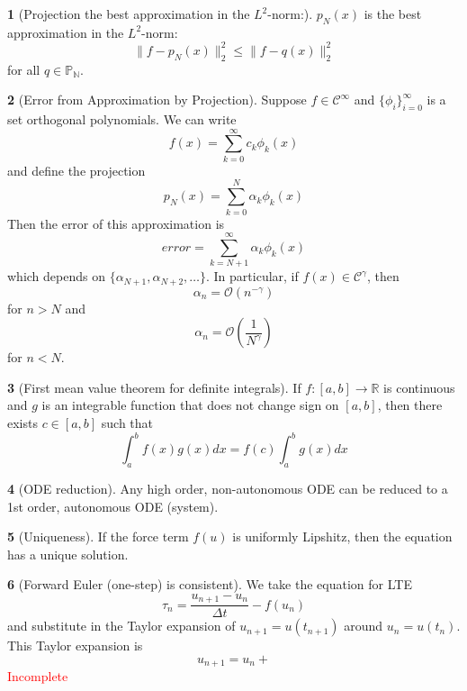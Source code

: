 \documentclass[12pt]{article}
\theoremstyle{definition}
\newtheorem{theorem}{\color{ForestGreen}{\textbf{Theorem}}}
\newcommand{\R}{\mathbb{R}}
\newcommand{\norm}[1]{\lVert#1\rVert}
\begin{document}
\begin{theorem}[Projection the best approximation in the $L^2$-norm:]
$p_N(x)$ is the best approximation in the $L^2$-norm:
\begin{equation}
\norm{f-p_N(x)}^2_2 \leq \norm{f-q(x)}^2_2
\end{equation}
for all $q \in \mathbb{P_N}$.
\end{theorem}

\begin{theorem}[Error from Approximation by Projection]
Suppose $f \in \mathcal{C}^\infty$ and $\{\phi_i\}_{i=0}^{\infty}$ is a set orthogonal polynomials. We can write
\begin{equation}
f(x) = \sum_{k=0}^\infty c_k \phi_k(x)
\end{equation}
and define the projection
\begin{equation}
p_N(x) = \sum_{k=0}^N \alpha_k \phi_k(x)
\end{equation}
Then the error of this approximation is
\begin{equation}
error = \sum_{k=N+1}^\infty \alpha_k \phi_k(x)
\end{equation}
which depends on $\{\alpha_{N+1}, \alpha_{N+2}, \ldots \}$. In particular, if $f(x) \in \mathcal{C}^\gamma$, then
\begin{equation}
\alpha_n = \mathcal{O}(n^{-\gamma})
\end{equation}
for $n > N$ and
\begin{equation}
\alpha_n = \mathcal{O}\left(\frac{1}{N^\gamma}\right)
\end{equation}
for $n < N$.
\end{theorem}

\begin{theorem}[First mean value theorem for definite integrals]
If $f:[a,b] \to \R$ is continuous and $g$ is an integrable function that does not change sign on $[a,b]$, then there exists $c \in [a,b]$ such that
\begin{equation}
\int_a^b f(x)g(x) dx = f(c)\int_a^b g(x)dx
\end{equation}
\end{theorem}

\begin{theorem}[ODE reduction]
Any high order, non-autonomous ODE can be reduced to a 1st order, autonomous ODE (system).
\end{theorem}

\begin{theorem}[Uniqueness]
If the force term $f(u)$ is uniformly Lipshitz, then the equation has a unique solution.
\end{theorem}

\begin{theorem}[Forward Euler (one-step) is consistent]
We take the equation for LTE
\begin{equation}
\tau_n = \frac{u_{n+1} - u_n}{\Delta t} - f(u_n)
\end{equation}
and substitute in the Taylor expansion of $u_{n+1} = u(t_{n+1})$ around $u_n = u(t_n)$. This Taylor expansion is
\begin{equation}
u_{n+1} = u_n +
\end{equation}
\textcolor{red}{Incomplete}
\end{theorem}
\end{document}
